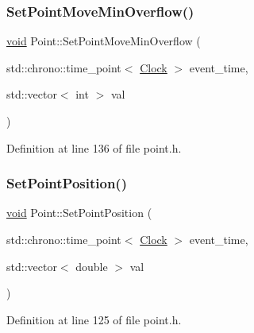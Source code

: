 \subsubsection{\texorpdfstring{Set\+Point\+Move\+Min\+Overflow()}{SetPointMoveMinOverflow()}}
{\footnotesize\ttfamily \mbox{\hyperlink{glad_8h_a950fc91edb4504f62f1c577bf4727c29}{void}} Point\+::\+Set\+Point\+Move\+Min\+Overflow (\begin{DoxyParamCaption}\item[{std\+::chrono\+::time\+\_\+point$<$ \mbox{\hyperlink{universe_8h_a0ef8d951d1ca5ab3cfaf7ab4c7a6fd80}{Clock}} $>$}]{event\+\_\+time,  }\item[{std\+::vector$<$ int $>$}]{val }\end{DoxyParamCaption})\hspace{0.3cm}{\ttfamily [inline]}}



Definition at line 136 of file point.\+h.

\mbox{\label{class_point_a9191f97ece64b8385140d5f800a3a4ca}} 
\subsubsection{\texorpdfstring{Set\+Point\+Position()}{SetPointPosition()}}
{\footnotesize\ttfamily \mbox{\hyperlink{glad_8h_a950fc91edb4504f62f1c577bf4727c29}{void}} Point\+::\+Set\+Point\+Position (\begin{DoxyParamCaption}\item[{std\+::chrono\+::time\+\_\+point$<$ \mbox{\hyperlink{universe_8h_a0ef8d951d1ca5ab3cfaf7ab4c7a6fd80}{Clock}} $>$}]{event\+\_\+time,  }\item[{std\+::vector$<$ double $>$}]{val }\end{DoxyParamCaption})\hspace{0.3cm}{\ttfamily [inline]}}



Definition at line 125 of file point.\+h.

